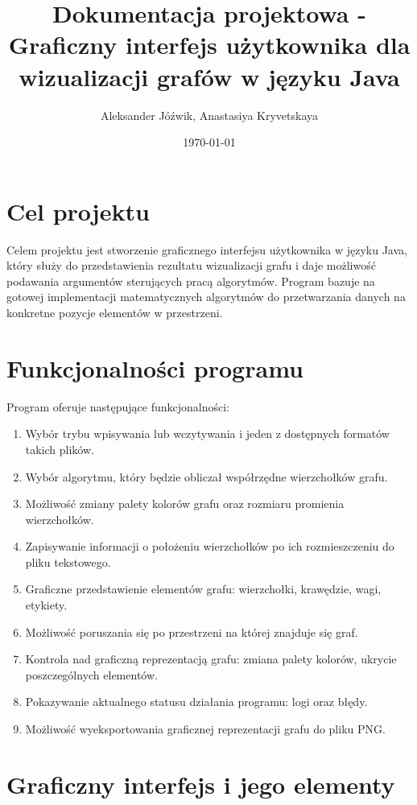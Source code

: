 \documentclass[]{article}
\title{Dokumentacja projektowa - Graficzny interfejs użytkownika dla wizualizacji grafów w języku Java}
\author{\authoricon Aleksander Jóźwik, Anastasiya Kryvetskaya}
\date{\dateicon \today}
\begin{document}
	\noindent
	\maketitle

	\tableofcontents
	\clearpage

    \section{Cel projektu}
	Celem projektu jest stworzenie graficznego interfejsu użytkownika w języku Java, który służy do przedstawienia rezultatu wizualizacji grafu i 
	daje możliwość podawania argumentów sterujących pracą algorytmów. Program bazuje na gotowej implementacji matematycznych algorytmów 
	do przetwarzania danych na konkretne pozycje elementów w przestrzeni.

	\section{Funkcjonalności programu}
	Program oferuje następujące funkcjonalności:
	\begin{enumerate}
		\item Wybór trybu wpisywania lub wczytywania i jeden z dostępnych formatów takich plików.
		\item Wybór algorytmu, który będzie obliczał współrzędne wierzchołków grafu.
		\item Możliwość zmiany palety kolorów grafu oraz rozmiaru promienia wierzchołków.
		\item Zapisywanie informacji o położeniu wierzchołków po ich rozmieszczeniu do pliku tekstowego.
		\item Graficzne przedstawienie elementów grafu: wierzchołki, krawędzie, wagi, etykiety.
		\item Możliwość poruszania się po przestrzeni na której znajduje się graf.
		\item Kontrola nad graficzną reprezentacją grafu: zmiana palety kolorów, ukrycie poszczególnych elementów.
		\item Pokazywanie aktualnego statusu działania programu: logi oraz błędy.
		\item Możliwość wyeksportowania graficznej reprezentacji grafu do pliku PNG.
	\end{enumerate}
	\clearpage
	
	\section{Graficzny interfejs i jego elementy}
	
\end{document}
